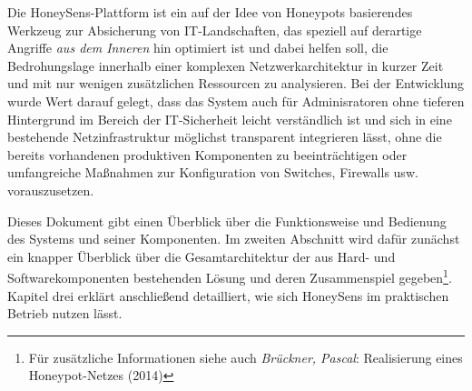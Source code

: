 \documentclass[12pt]{article}
\begin{document}
Die HoneySens-Plattform ist ein auf der Idee von Honeypots basierendes Werkzeug zur Absicherung von IT-Landschaften, das speziell auf derartige Angriffe \textit{aus dem Inneren} hin optimiert ist und dabei helfen soll, die Bedrohungslage innerhalb einer komplexen Netzwerkarchitektur in kurzer Zeit und mit nur wenigen zusätzlichen Ressourcen zu analysieren. Bei der Entwicklung wurde Wert darauf gelegt, dass das System auch für Adminisratoren ohne tieferen Hintergrund im Bereich der IT-Sicherheit leicht verständlich ist und sich in eine bestehende Netzinfrastruktur möglichst transparent integrieren lässt, ohne die bereits vorhandenen produktiven Komponenten zu beeinträchtigen oder umfangreiche Maßnahmen zur Konfiguration von Switches, Firewalls usw. vorauszusetzen.

Dieses Dokument gibt einen Überblick über die Funktionsweise und Bedienung des Systems und seiner Komponenten. Im zweiten Abschnitt wird dafür zunächst ein knapper Überblick über die Gesamtarchitektur der aus Hard- und Softwarekomponenten bestehenden Lösung und deren Zusammenspiel gegeben\footnote{Für zusätzliche Informationen siehe auch \textit{Brückner, Pascal}: Realisierung eines Honeypot-Netzes (2014)}. Kapitel drei erklärt anschließend detailliert, wie sich HoneySens im praktischen Betrieb nutzen lässt.
\end{document}
